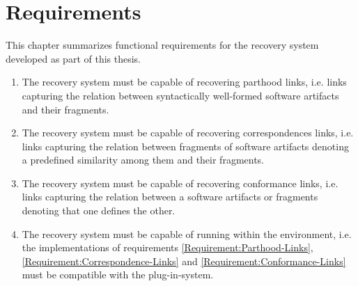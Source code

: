 \chapter{Requirements}
This chapter summarizes functional requirements for the recovery system developed as part of this thesis.

\begin{enumerate}[label=\textbf{Req.\arabic*},ref=Req.\arabic*]

\item
\label{Requirement:Parthood-Links}
The recovery system must be capable of recovering parthood links, i.e. links capturing the relation between syntactically well-formed software artifacts and their fragments.

\item
\label{Requirement:Correspondence-Links}
The recovery system must be capable of recovering correspondences links, i.e. links capturing the relation between fragments of software artifacts denoting a predefined similarity among them and their fragments.


\item
\label{Requirement:Conformance-Links} 
The recovery system must be capable of recovering conformance links, i.e. links capturing the relation between a software artifacts or fragments denoting that one defines the other.


\item 
\label{Requirement:Megal-Xtext}
The recovery system must be capable of running within the \megalxtext environment, i.e. the implementations of requirements \ref{Requirement:Parthood-Links}, \ref{Requirement:Correspondence-Links} and \ref{Requirement:Conformance-Links} must be compatible with the \megalxtext plug-in-system.

\end{enumerate}
